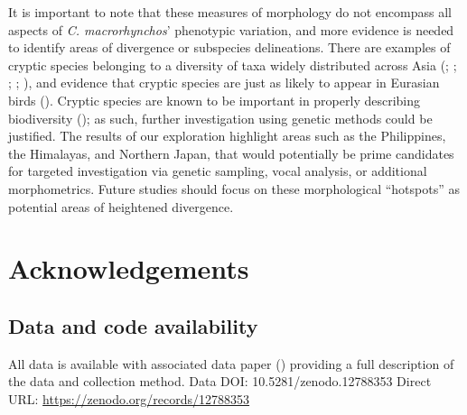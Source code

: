 \documentclass[10pt,a4paper]{article}
\begin{document}
It is important to note that these measures of morphology do not encompass all aspects of \emph{C. macrorhynchos}' phenotypic variation, and more evidence is needed to identify areas of divergence or subspecies delineations.
There are examples of cryptic species belonging to a diversity of taxa widely distributed across Asia (; ; ; ; ), and evidence that cryptic species are just as likely to appear in Eurasian birds ().
Cryptic species are known to be important in properly describing biodiversity (); as such, further investigation using genetic methods could be justified.
The results of our exploration highlight areas such as the Philippines, the Himalayas, and Northern Japan, that would potentially be prime candidates for targeted investigation via genetic sampling, vocal analysis, or additional morphometrics.
Future studies should focus on these morphological ``hotspots'' as potential areas of heightened divergence.

\section{Acknowledgements}\label{acknowledgements}

\subsection{Data and code availability}\label{data-and-code-availability}

All data is available with associated data paper () providing a full description of the data and collection method.
Data DOI: 10.5281/zenodo.12788353
Direct URL: \url{https://zenodo.org/records/12788353}
\end{document}
